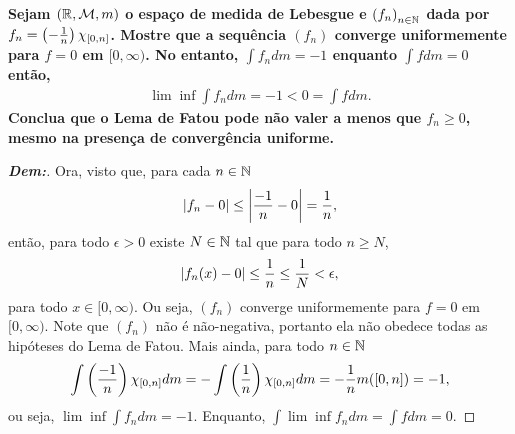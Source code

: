 \textbf{
  Sejam $(\mathbb R, \mathcal M, m)$ o espaço de medida de Lebesgue e $\left(f_n\right)_{n \in \mathbb N}$ dada por 
  $f_n = \left(-\frac{1}{n}\right) \chi_{[0, n]}$. Mostre que a sequência 
  $(f_n)$ converge uniformemente para $f = 0$ em $[0, \infty)$. No entanto, 
  $\int f_n dm = -1$ enquanto $\int f dm =0$ então, 
  \begin{align*}
    \lim \inf \int f_n dm = -1 < 0 = \int f dm.
  \end{align*}
  Conclua que o Lema de Fatou pode não valer a menos que $f_n \ge 0$, mesmo na presença 
  de convergência uniforme.
}
\begin{proof}[\textbf{Dem:}]
  Ora, visto que, para cada $n \in \mathbb N$
  \begin{align*}
    \left|f_n - 0 \right| \le \left|\frac{-1}{n}-0\right| = \frac{1}{n},
  \end{align*}
  então, para todo $\epsilon > 0$ existe $N \in \mathbb N$ tal que para todo $n \ge N$, 
  \begin{align*}
    \left|f_n(x) - 0\right| \le \frac{1}{n} \le \frac{1}{N} < \epsilon,
  \end{align*}
  para todo $x \in [0, \infty)$. Ou seja, $(f_n)$ converge uniformemente para $f=0$ 
  em $[0, \infty)$. Note que $(f_n)$ não é não-negativa, portanto ela não obedece 
  todas as hipóteses do Lema de Fatou. Mais ainda, para todo $n \in \mathbb N$
  \begin{align*}
    \int \left(\frac{-1}{n}\right)\chi_{[0, n]} dm= - \int \left(\frac{1}{n}\right)\chi_{[0, n]} dm = - \frac{1}{n}m([0, n])= -1,
  \end{align*}
  ou seja, $\lim \inf \int f_n dm = -1$. Enquanto, $\int \lim\inf f_n dm = \int f dm = 0$.
  
\end{proof}

